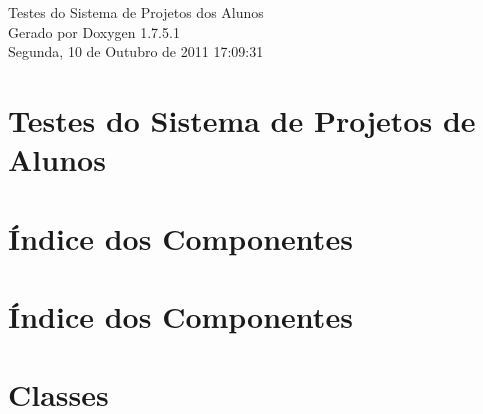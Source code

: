 \documentclass[a4paper]{book}
\begin{document}
\hypersetup{pageanchor=false,citecolor=blue}
\begin{titlepage}
\vspace*{7cm}
\begin{center}
{\Large \-Testes do \-Sistema de \-Projetos dos \-Alunos }\\
\vspace*{1cm}
{\large \-Gerado por Doxygen 1.7.5.1}\\
\vspace*{0.5cm}
{\small Segunda, 10 de Outubro de 2011 17:09:31}\\
\end{center}
\end{titlepage}
\clearemptydoublepage
{}
\tableofcontents
\clearemptydoublepage
{}
\hypersetup{pageanchor=true,citecolor=blue}
\chapter{\-Testes do \-Sistema de \-Projetos de \-Alunos}
\label{index}\hypertarget{index}{}
\chapter{Índice dos \-Componentes}

\chapter{Índice dos \-Componentes}

\chapter{\-Classes}










\printindex
\end{document}
